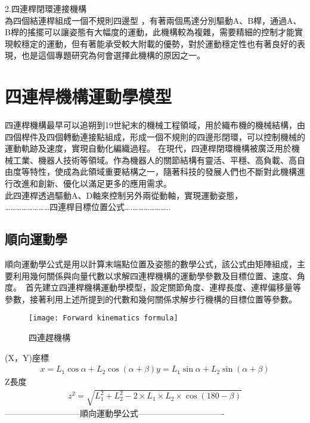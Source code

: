 2.四連桿閉環連接機構\\
為四個結連桿組成一個不規則四邊型 ，有著兩個馬達分別驅動A、B桿，通過A、B桿的搖擺可以讓姿態有大幅度的運動，此機構較為複雜，需要精細的控制才能實現較穩定的運動，但有著能承受較大附載的優勢，對於運動穩定性也有著良好的表現，也是這個專題研究為何會選擇此機構的原因之一。\\

\section{四連桿機構運動學模型}

四連桿機構最早可以追朔到19世紀末的機械工程領域，用於織布機的機械結構，由四個桿件及四個轉動連接點組成，形成一個不規則的四邊形閉環，可以控制機械的運動軌跡及速度，實現自動化編織過程。
在現代，四連桿閉環機構被廣泛用於機械工業、機器人技術等領域。作為機器人的關節結構有靈活、平穩、高負載、高自由度等特性，使成為此領域重要結構之一，隨著科技的發展人們也不斷對此機構進行改進和創新、優化以滿足更多的應用需求。\\
 此四連桿透過驅動A、D軸來控制另外兩從動軸，實現運動姿態，\\

……………………四連桿目標位置公式….………………..

\subsection{順向運動學}
順向運動學公式是用以計算末端點位置及姿態的數學公式，該公式由矩陣組成，主要利用幾何關係與向量代數以求解四連桿機構的運動學參數及目標位置、速度、角度。\
首先建立四連桿機構運動學模型，設定關節角度、連桿長度、連桿偏移量等參數，接著利用上述所提到的代數和幾何關係求解步行機構的目標位置等參數。\\

\begin{figure}[hbt!]
\begin{center}
\texttt{[image: Forward kinematics formula]}
\caption{\Large 四連趕機構}\label{Forward kinematics formula}
\end{center}
\end{figure}
(X，Y)座標    
\[
\begin{aligned}
x=L_{1}\cos \alpha +L_{2}\cos \left( \alpha +\beta \right)
y=L_{1}\sin \alpha +L_{2}\sin \left( \alpha +\beta \right) 
\end{aligned}
\]
Z長度
\[
\begin{aligned}
z^{2}=\sqrt{L_{1}^{2}+L_{2}^{2}-2\times L_{1}\times L_{2}\times \cos \left( 180-\beta \right) }
\end{aligned}
\]
---------------------------順向運動學公式-------------------------------


